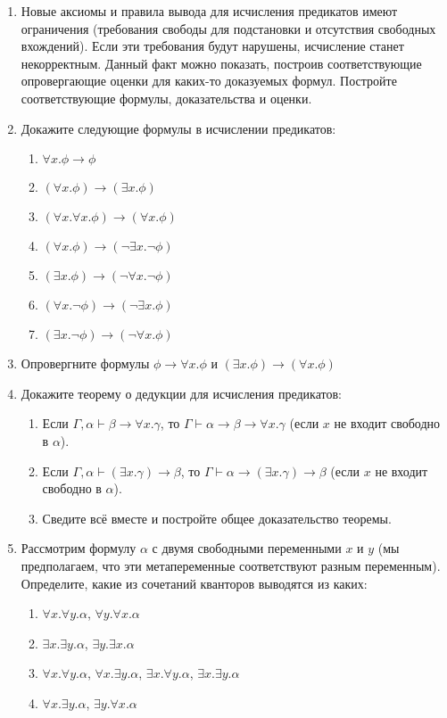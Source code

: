 \documentclass[10pt,a4paper,oneside]{article}
\begin{document}
\begin{enumerate}
\item Новые аксиомы и правила вывода для исчисления предикатов имеют ограничения
(требования свободы для подстановки и отсутствия свободных вхождений). 
Если эти требования будут нарушены, исчисление станет некорректным.
Данный факт можно показать, построив соответствующие опровергающие
оценки для каких-то доказуемых формул. Постройте соответствующие формулы,
доказательства и оценки.

\item Докажите следующие формулы в исчислении предикатов:
\begin{enumerate}
\item $\forall x.\phi\rightarrow \phi$
\item $(\forall x.\phi)\rightarrow (\exists x.\phi)$
\item $(\forall x.\forall x.\phi) \rightarrow (\forall x.\phi)$
\item $(\forall x.\phi) \rightarrow (\neg \exists x.\neg \phi)$ 
\item $(\exists x.\phi) \rightarrow (\neg \forall x.\neg \phi)$
\item $(\forall x.\neg\phi) \rightarrow (\neg \exists x.\phi)$ 
\item $(\exists x.\neg\phi) \rightarrow (\neg \forall x.\phi)$
\end{enumerate}

\item Опровергните формулы $\phi\rightarrow\forall x. \phi$ и $(\exists x.\phi)\rightarrow (\forall x.\phi)$

\item Докажите теорему о дедукции для исчисления предикатов:
\begin{enumerate}
\item Если $\Gamma, \alpha \vdash \beta\rightarrow\forall x.\gamma$, то
$\Gamma\vdash\alpha\rightarrow\beta\rightarrow\forall x.\gamma$ (если $x$ не входит
свободно в $\alpha$).
\item Если $\Gamma, \alpha \vdash (\exists x.\gamma)\rightarrow\beta$, то
$\Gamma\vdash\alpha\rightarrow(\exists x.\gamma)\rightarrow\beta$ (если $x$ не входит
свободно в $\alpha$).
\item Сведите всё вместе и постройте общее доказательство теоремы.
\end{enumerate}

\item Рассмотрим формулу $\alpha$ с двумя свободными переменными $x$ и $y$ (мы предполагаем,
что эти метапеременные соответствуют разным переменным).
Определите, какие из сочетаний кванторов выводятся из каких:
\begin{enumerate}
\item $\forall x.\forall y.\alpha$, $\forall y.\forall x.\alpha$
\item $\exists x.\exists y.\alpha$, $\exists y.\exists x.\alpha$
\item $\forall x.\forall y.\alpha$, $\forall x.\exists y.\alpha$, $\exists x.\forall y.\alpha$, $\exists x.\exists y.\alpha$
\item $\forall x.\exists y.\alpha$, $\exists y.\forall x.\alpha$
\end{enumerate}


\end{enumerate}
\end{document}
